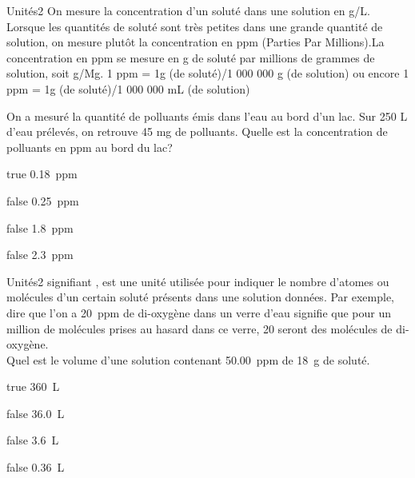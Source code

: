 \documentclass[11pt]{article}
\begin{document}
            
            
            \begin{question}{}{Unités}{2}{}
                On mesure la concentration d'un soluté dans une solution en g/L. Lorsque les quantités de soluté sont très petites dans une grande quantité de solution, on mesure plutôt la concentration en ppm (Parties Par Millions).La concentration en ppm se mesure en g de soluté par millions de grammes de solution, soit g/Mg.
                1 ppm = 1g (de soluté)/1 000 000 g (de solution) ou encore  1 ppm = 1g (de soluté)/1 000 000 mL (de solution) 
                
                On a mesuré la quantité de polluants émis dans l'eau au bord d'un lac. Sur 250 L d'eau prélevés, on retrouve 45 mg de polluants. Quelle est la concentration de polluants en ppm au bord du lac? 
            \end{question}
              
            \begin{reponses} 
                \item[true]   \SI{.18}{ppm}
                \item[false]  \SI{.25}{ppm}
                \item[false]   \SI{1.8}{ppm}
        	    \item[false]  \SI{2.3}{ppm}
            \end{reponses}
            
            \begin{question}{}{Unités}{2}{}
                 signifiant , est une unité utilisée pour indiquer le nombre d'atomes ou molécules d'un certain soluté présents dans une solution données. Par exemple, dire que l'on a \SI{20}{ppm} de di-oxygène dans un verre d'eau signifie que pour un million de molécules prises au hasard dans ce verre, 20 seront des molécules de di-oxygène.\\
                Quel est le volume d'une solution contenant \SI{50.00}{ppm} de \SI{18}{\gram} de soluté. 
            \end{question}
              
            \begin{reponses} 
                \item[true]   \SI{360}{\liter}
                \item[false]  \SI{36.0}{\liter}
                \item[false]   \SI{3.6}{\liter}
        	    \item[false]  \SI{0.36}{\liter}
            \end{reponses}
    
\end{document}
